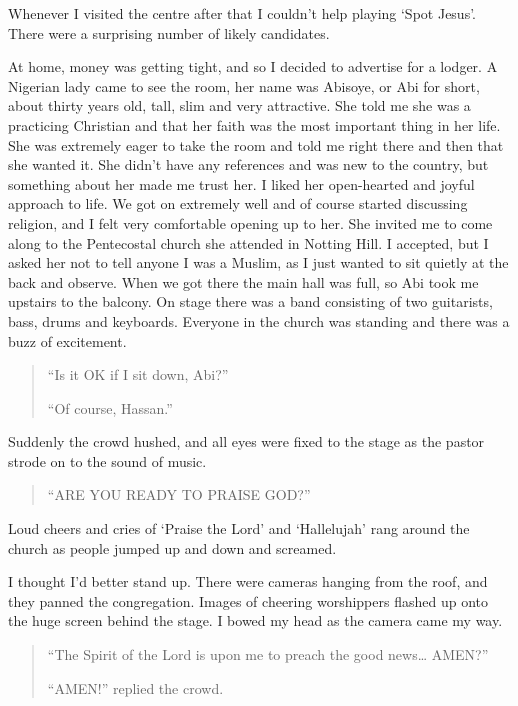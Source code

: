 \documentclass[12pt]{memoir}
\begin{document}
Whenever I visited the centre after that I couldn’t help playing ‘Spot Jesus’.
There were a surprising number of likely candidates.

At home, money was getting tight, and so I decided to advertise for a lodger.
A Nigerian lady came to see the room, her name was Abisoye,
or Abi for short, about thirty years old, tall, slim and very attractive.
She told me she was a practicing Christian
and that her faith was the most important thing in her life.
She was extremely eager to take the room and told me right there
and then that she wanted it.
She didn’t have any references and was new to the country,
but something about her made me trust her.
I liked her open-hearted and joyful approach to life.
We got on extremely well and of course started discussing religion,
and I felt very comfortable opening up to her.
She invited me to come along to the Pentecostal church
she attended in Notting Hill.
I accepted, but I asked her not to tell anyone I was a Muslim,
as I just wanted to sit quietly at the back and observe.
When we got there the main hall was full,
so Abi took me upstairs to the balcony.
On stage there was a band consisting of two guitarists,
bass, drums and keyboards.
Everyone in the church was standing and there was a buzz of excitement.

\begin{quote}
“Is it OK if I sit down, Abi?”

“Of course, Hassan.”
\end{quote}

Suddenly the crowd hushed, and all eyes were fixed to the stage
as the pastor strode on to the sound of music.

\begin{quote}
“ARE YOU READY TO PRAISE GOD?”
\end{quote}

Loud cheers and cries of ‘Praise the Lord’ and ‘Hallelujah’
rang around the church as people jumped up and down and screamed.

I thought I’d better stand up.
There were cameras hanging from the roof, and they panned the congregation.
Images of cheering worshippers flashed up
onto the huge screen behind the stage.
I bowed my head as the camera came my way.

\begin{quote}
“The Spirit of the Lord is upon me to preach the good news… AMEN?”

“AMEN!” replied the crowd.
\end{quote}
\end{document}
